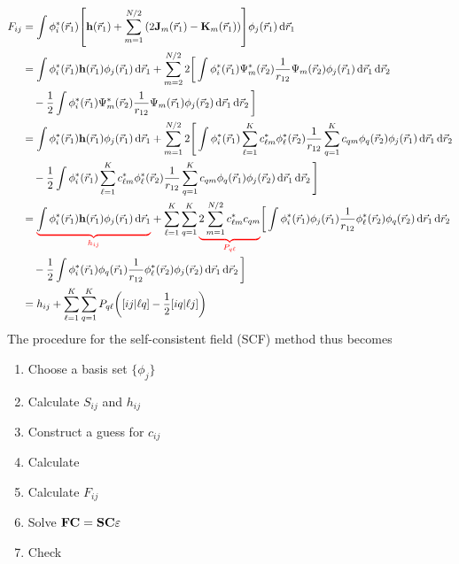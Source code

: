\documentclass[12pt,a4paper,titlepage]{article}
\begin{document}
\begin{equation}
\begin{aligned}
F_{ij}&=\int\phi_{i}^{*}(\vec{r}_{1})\qty[\vb{h}(\vec{r}_{1})+\sum_{m=1}^{N/2}\qty(2\vb{J}_{m}(\vec{r}_{1})-\vb{K}_{m}(\vec{r}_{1}))]\phi_{j}(\vec{r}_{1})\dd{\vec{r}_{1}}\\
&=\int\phi_{i}^{*}(\vec{r}_{1})\vb{h}(\vec{r}_{1})\phi_{j}(\vec{r}_{1})\dd{\vec{r}_{1}}+\sum_{m=2}^{N/2}2\bigg[\int\phi_{i}^{*}(\vec{r}_{1})\Psi_{m}^{*}(\vec{r}_{2})\frac{1}{r_{12}}\Psi_{m}(\vec{r}_{2})\phi_{j}(\vec{r}_{1})\dd{\vec{r}_{1}}\dd{\vec{r}_{2}}\\
&\quad-\frac{1}{2}\int\phi_{i}^{*}(\vec{r}_{1})\Psi_{m}^{*}(\vec{r}_{2})\frac{1}{r_{12}}\Psi_{m}(\vec{r}_{1})\phi_{j}(\vec{r}_{2})\dd{\vec{r}_{1}}\dd{\vec{r}_{2}}\bigg]\\
&=\int\phi_{i}^{*}(\vec{r}_{1})\vb{h}(\vec{r}_{1})\phi_{j}(\vec{r}_{1})\dd{\vec{r}_{1}}+\sum_{m=1}^{N/2}2\Bigg[\int\phi_{i}^{*}(\vec{r}_{1})\sum_{\ell=1}^{K}c_{\ell m}^{*}\phi_{\ell}^{*}(\vec{r}_{2})\frac{1}{r_{12}}\sum_{q=1}^{K}c_{qm}\phi_{q}(\vec{r}_{2})\phi_{j}(\vec{r}_{1})\dd{\vec{r}_{1}}\dd{\vec{r}_{2}}\\
&\quad-\frac{1}{2}\int\phi_{i}^{*}(\vec{r}_{1})\sum_{\ell=1}^{K}c_{\ell m}^{*}\phi_{\ell}^{*}(\vec{r}_{2})\frac{1}{r_{12}}\sum_{q=1}^{K}c_{qm}\phi_{q}(\vec{r}_{1})\phi_{j}(\vec{r}_{2})\dd{\vec{r}_{1}}\dd{\vec{r}_{2}}\Bigg]\\
&={\color{red}\underbrace{\color{black}\int\phi_{i}^{*}(\vec{r}_{1})\vb{h}(\vec{r}_{1})\phi_{j}(\vec{r}_{1})\dd{\vec{r}_{1}}}_{h_{ij}}}+\sum_{\ell=1}^{K}\sum_{q=1}^{K}{\color{red}\underbrace{\color{black}2\sum_{m=1}^{N/2}c_{\ell m}^{*}c_{qm}}_{P_{q\ell}}}\bigg[\int\phi_{i}^{*}(\vec{r}_{1})\phi_{j}(\vec{r}_{1})\frac{1}{r_{12}}\phi_{\ell}^{*}(\vec{r}_{2})\phi_{q}(\vec{r}_{2})\dd{\vec{r}_{1}}\dd{\vec{r}_{2}}\\
&\quad-\frac{1}{2}\int\phi_{i}^{*}(\vec{r}_{1})\phi_{q}(\vec{r}_{1})\frac{1}{r_{12}}\phi_{\ell}^{*}(\vec{r}_{2})\phi_{j}(\vec{r}_{2})\dd{\vec{r}_{1}}\dd{\vec{r}_{2}}\bigg]\\
&=h_{ij}+\sum_{\ell=1}^{K}\sum_{q=1}^{K}P_{q\ell}\qty([ij|\ell q]-\frac{1}{2}[iq|\ell j])
\end{aligned}
\end{equation}
The procedure for the self-consistent field (SCF) method thus becomes
\begin{enumerate}
\item Choose a basis set $\{\phi_{j}\}$
\item Calculate $S_{ij}$ and $h_{ij}$
\item Construct a guess for $c_{ij}$
\item Calculate 
\item Calculate $F_{ij}$
\item Solve $\vb{F}\vb{C}=\vb{S}\vb{C}\vb{\varepsilon}$
\item Check 
\end{enumerate}
\end{document}
